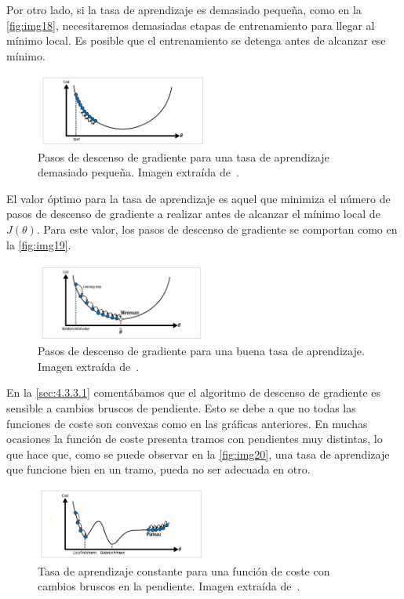 Por otro lado, si la tasa de aprendizaje es demasiado pequeña, como en la \autoref{fig:img18}, necesitaremos demasiadas etapas de entrenamiento para llegar al mínimo local. Es posible que el entrenamiento se detenga antes de alcanzar ese mínimo. 

 \begin{figure}[htbp]
    \centering
    \includegraphics[width=0.5\textwidth]{img/img18.png}
    \caption{Pasos de descenso de gradiente para una tasa de aprendizaje demasiado pequeña. Imagen extraída de~\cite{Buric2020}.}
    \label{fig:img18}
\end{figure}

El valor óptimo para la tasa de aprendizaje es aquel que minimiza el número de pasos de descenso de gradiente a realizar antes de alcanzar el mínimo local de $J(\theta)$. Para este valor, los pasos de descenso de gradiente se comportan como en la \autoref{fig:img19}.

 \begin{figure}[htbp]
    \centering
    \includegraphics[width=0.5\textwidth]{img/img19.png}
    \caption{Pasos de descenso de gradiente para una buena tasa de aprendizaje. Imagen extraída de~\cite{Buric2020}.}
    \label{fig:img19}
\end{figure}

En la \autoref{sec:4.3.3.1} comentábamos que el algoritmo de descenso de gradiente es sensible a cambios bruscos de pendiente. Esto se debe a que no todas las funciones de coste son convexas como en las gráficas anteriores. En muchas ocasiones la función de coste presenta tramos con pendientes muy distintas, lo que hace que, como se puede observar en la \autoref{fig:img20}, una tasa de aprendizaje que funcione bien en un tramo, pueda no ser adecuada en otro.  \\
 \begin{figure}[htbp]
    \centering
    \includegraphics[width=0.5\textwidth]{img/img20.png}
    \caption{Tasa de aprendizaje constante para una función de coste con cambios bruscos en la pendiente. Imagen extraída de~\cite{Buric2020}. }
    \label{fig:img20}
\end{figure}


